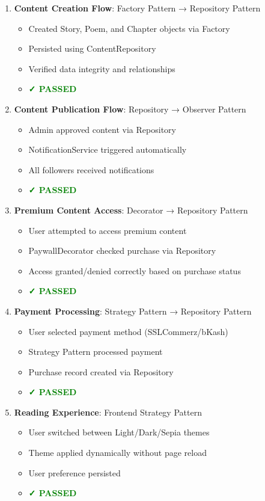 \begin{enumerate}
    \item \textbf{Content Creation Flow}: Factory Pattern → Repository Pattern
    \begin{itemize}
        \item Created Story, Poem, and Chapter objects via Factory
        \item Persisted using ContentRepository
        \item Verified data integrity and relationships
        \item \textcolor{green}{\textbf{✓ PASSED}}
    \end{itemize}
    
    \item \textbf{Content Publication Flow}: Repository → Observer Pattern
    \begin{itemize}
        \item Admin approved content via Repository
        \item NotificationService triggered automatically
        \item All followers received notifications
        \item \textcolor{green}{\textbf{✓ PASSED}}
    \end{itemize}
    
    \item \textbf{Premium Content Access}: Decorator → Repository Pattern
    \begin{itemize}
        \item User attempted to access premium content
        \item PaywallDecorator checked purchase via Repository
        \item Access granted/denied correctly based on purchase status
        \item \textcolor{green}{\textbf{✓ PASSED}}
    \end{itemize}
    
    \item \textbf{Payment Processing}: Strategy Pattern → Repository Pattern
    \begin{itemize}
        \item User selected payment method (SSLCommerz/bKash)
        \item Strategy Pattern processed payment
        \item Purchase record created via Repository
        \item \textcolor{green}{\textbf{✓ PASSED}}
    \end{itemize}
    
    \item \textbf{Reading Experience}: Frontend Strategy Pattern
    \begin{itemize}
        \item User switched between Light/Dark/Sepia themes
        \item Theme applied dynamically without page reload
        \item User preference persisted
        \item \textcolor{green}{\textbf{✓ PASSED}}
    \end{itemize}
\end{enumerate}

